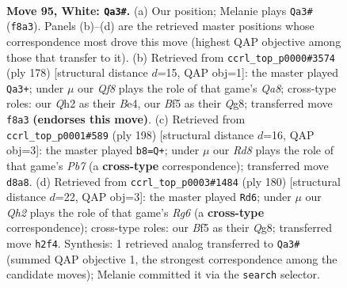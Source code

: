 \documentclass[11pt]{article}
\begin{document}
\clearpage

\begin{figure}[p]\centering
\begin{subfigure}{0.46\textwidth}\centering
\resizebox{\linewidth}{!}{%
\newchessgame
\chessboard[
  setfen={3R1Q2/8/8/5B2/8/5k2/7Q/7K w - - 3 95},
  showmover=false,
  pgfstyle=straightmove, color=movearrow, markmove={f8-a3}
]}
\caption{}
\end{subfigure}\hfill
\begin{subfigure}{0.46\textwidth}\centering
\resizebox{\linewidth}{!}{%
\newchessgame
\chessboard[
  setfen={Q5Q1/8/7K/2k5/4B3/8/8/8 w - - 1 90},
  showmover=false,
  pgfstyle=straightmove, color=movearrow, markmove={a8-a3}
]}
\caption{}
\end{subfigure}
\\[4pt]
\begin{subfigure}{0.46\textwidth}\centering
\resizebox{\linewidth}{!}{%
\newchessgame
\chessboard[
  setfen={8/1P6/2QK4/3B4/1k6/8/8/8 w - - 1 100},
  showmover=false,
  pgfstyle=straightmove, color=movearrow, markmove={b7-b8}
]}
\caption{}
\end{subfigure}\hfill
\begin{subfigure}{0.46\textwidth}\centering
\resizebox{\linewidth}{!}{%
\newchessgame
\chessboard[
  setfen={6Q1/8/6R1/4k1K1/1r6/8/8/8 w - - 3 91},
  showmover=false,
  pgfstyle=straightmove, color=movearrow, markmove={g6-d6}
]}
\caption{}
\end{subfigure}
\caption{\textbf{Move 95, White: \texttt{Qa3\#}.} (a) Our position; Melanie plays \texttt{Qa3\#} (\texttt{f8a3}). Panels (b)--(d) are the retrieved master positions whose correspondence most drove this move (highest QAP objective among those that transfer to it). (b) Retrieved from \texttt{ccrl\_top\_p0000\#3574} (ply 178) [structural distance $d$=15, QAP obj=1]: the master played \texttt{Qa3+}; under $\mu$ our \emph{Qf8} plays the role of that game's \emph{Qa8}; cross-type roles: our \emph{Q}h2 as their \emph{B}e4, our \emph{B}f5 as their \emph{Q}g8; transferred move \texttt{f8a3} \textbf{(endorses this move)}. (c) Retrieved from \texttt{ccrl\_top\_p0001\#589} (ply 198) [structural distance $d$=16, QAP obj=3]: the master played \texttt{b8=Q+}; under $\mu$ our \emph{Rd8} plays the role of that game's \emph{Pb7} (a \textbf{cross-type} correspondence); transferred move \texttt{d8a8}. (d) Retrieved from \texttt{ccrl\_top\_p0003\#1484} (ply 180) [structural distance $d$=22, QAP obj=3]: the master played \texttt{Rd6}; under $\mu$ our \emph{Qh2} plays the role of that game's \emph{Rg6} (a \textbf{cross-type} correspondence); cross-type roles: our \emph{B}f5 as their \emph{Q}g8; transferred move \texttt{h2f4}. Synthesis: 1 retrieved analog transferred to \texttt{Qa3\#} (summed QAP objective 1, the strongest correspondence among the candidate moves); Melanie committed it via the \texttt{search} selector.}
\label{fig:thought-m188}
\end{figure}
\end{document}
